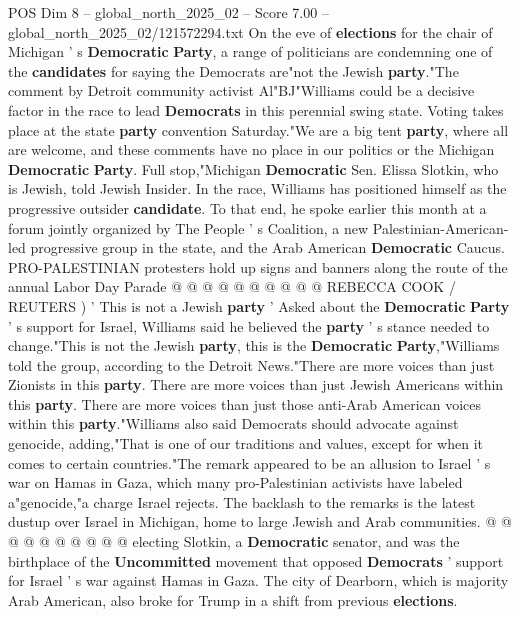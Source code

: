 \begin{textsample}{POS Dim 8 – global\_north\_2025\_02 – Score 7.00 – global\_north\_2025\_02/121572294.txt}  \label{ex:f8_pos_312}
On the eve of \textbf{elections} for the chair of Michigan ' s \textbf{Democratic} \textbf{Party}, a range of politicians are condemning one of the \textbf{candidates} for saying the Democrats are"not the Jewish \textbf{party}."The comment by Detroit community activist Al"BJ"Williams could be a decisive factor in the race to lead \textbf{Democrats} in this perennial swing state.
Voting takes place at the state \textbf{party} convention Saturday."We are a big tent \textbf{party}, where all are welcome, and these comments have no place in our politics or the Michigan \textbf{Democratic} \textbf{Party}.
Full stop,"Michigan \textbf{Democratic} Sen.
Elissa Slotkin, who is Jewish, told Jewish Insider.
In the race, Williams has positioned himself as the progressive outsider \textbf{candidate}.
To that end, he spoke earlier this month at a forum jointly organized by The People ' s Coalition, a new Palestinian-American-led progressive group in the state, and the Arab American \textbf{Democratic} Caucus.
PRO-PALESTINIAN protesters hold up signs and banners along the route of the annual Labor Day Parade @ @ @ @ @ @ @ @ @ @ REBECCA COOK / REUTERS ) ' This is not a Jewish \textbf{party} ' Asked about the \textbf{Democratic} \textbf{Party} ' s support for Israel, Williams said he believed the \textbf{party} ' s stance needed to change."This is not the Jewish \textbf{party}, this is the \textbf{Democratic} \textbf{Party},"Williams told the group, according to the Detroit News."There are more voices than just Zionists in this \textbf{party}.
There are more voices than just Jewish Americans within this \textbf{party}.
There are more voices than just those anti-Arab American voices within this \textbf{party}."Williams also said Democrats should advocate against genocide, adding,"That is one of our traditions and values, except for when it comes to certain countries."The remark appeared to be an allusion to Israel ' s war on Hamas in Gaza, which many pro-Palestinian activists have labeled a"genocide,"a charge Israel rejects.
The backlash to the remarks is the latest dustup over Israel in Michigan, home to large Jewish and Arab communities. @ @ @ @ @ @ @ @ @ @ electing Slotkin, a \textbf{Democratic} senator, and was the birthplace of the \textbf{Uncommitted} movement that opposed \textbf{Democrats} ' support for Israel ' s war against Hamas in Gaza.
The city of Dearborn, which is majority Arab American, also broke for Trump in a shift from previous \textbf{elections}.

\end{textsample}
